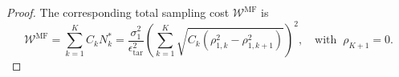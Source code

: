 \begin{proof}
The corresponding total sampling cost $\mathcal{W}^\text{MF}$ is
%
\begin{equation}\label{eq:MFMC_sampling_cost}
    \mathcal{W}^\text{MF} = \sum_{k=1}^K C_k N_k^* = \frac{\sigma_1^2}{\epsilon_{\text{tar}}^2}\left(\sum_{k=1}^K\sqrt{C_k\left(\rho_{1,k}^2 - \rho_{1,k+1}^2\right)}\right)^2,\quad \text{with}\;\;\rho_{K+1}=0.
\end{equation}
%











\end{proof}

